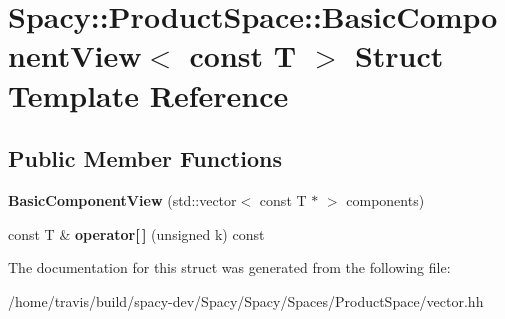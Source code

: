 \hypertarget{structSpacy_1_1ProductSpace_1_1BasicComponentView_3_01const_01T_01_4}{\section{Spacy\-:\-:Product\-Space\-:\-:Basic\-Component\-View$<$ const T $>$ Struct Template Reference}
\label{structSpacy_1_1ProductSpace_1_1BasicComponentView_3_01const_01T_01_4}
}
\subsection*{Public Member Functions}
\begin{DoxyCompactItemize}
\item 
\hypertarget{structSpacy_1_1ProductSpace_1_1BasicComponentView_3_01const_01T_01_4_a52bd2d3c9fd74bd33998586a0e18899b}{{\bfseries Basic\-Component\-View} (std\-::vector$<$ const T $\ast$ $>$ components)}\label{structSpacy_1_1ProductSpace_1_1BasicComponentView_3_01const_01T_01_4_a52bd2d3c9fd74bd33998586a0e18899b}

\item 
\hypertarget{structSpacy_1_1ProductSpace_1_1BasicComponentView_3_01const_01T_01_4_a1b6db224f3a762bae833aadc0898cda5}{const T \& {\bfseries operator\mbox{[}$\,$\mbox{]}} (unsigned k) const }\label{structSpacy_1_1ProductSpace_1_1BasicComponentView_3_01const_01T_01_4_a1b6db224f3a762bae833aadc0898cda5}

\end{DoxyCompactItemize}


The documentation for this struct was generated from the following file\-:\begin{DoxyCompactItemize}
\item 
/home/travis/build/spacy-\/dev/\-Spacy/\-Spacy/\-Spaces/\-Product\-Space/vector.\-hh\end{DoxyCompactItemize}
